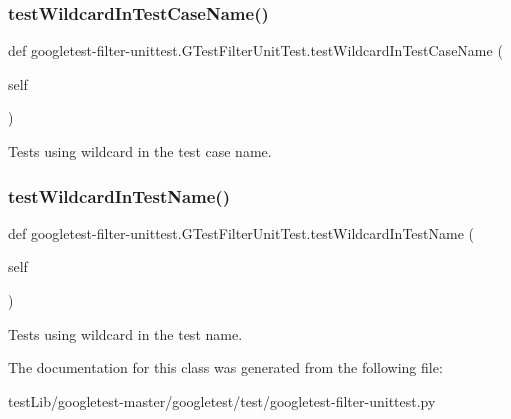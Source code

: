 \subsubsection{\texorpdfstring{test\+Wildcard\+In\+Test\+Case\+Name()}{testWildcardInTestCaseName()}}
{\footnotesize\ttfamily def googletest-\/filter-\/unittest.\+G\+Test\+Filter\+Unit\+Test.\+test\+Wildcard\+In\+Test\+Case\+Name (\begin{DoxyParamCaption}\item[{}]{self }\end{DoxyParamCaption})}

\begin{DoxyVerb}Tests using wildcard in the test case name.\end{DoxyVerb}
 \mbox{\label{classgoogletest-filter-unittest_1_1GTestFilterUnitTest_a57c51a39e4e5578dc6e0a0dd47c2875c}} 
\subsubsection{\texorpdfstring{test\+Wildcard\+In\+Test\+Name()}{testWildcardInTestName()}}
{\footnotesize\ttfamily def googletest-\/filter-\/unittest.\+G\+Test\+Filter\+Unit\+Test.\+test\+Wildcard\+In\+Test\+Name (\begin{DoxyParamCaption}\item[{}]{self }\end{DoxyParamCaption})}

\begin{DoxyVerb}Tests using wildcard in the test name.\end{DoxyVerb}
 

The documentation for this class was generated from the following file\+:\begin{DoxyCompactItemize}
\item 
test\+Lib/googletest-\/master/googletest/test/googletest-\/filter-\/unittest.\+py\end{DoxyCompactItemize}
